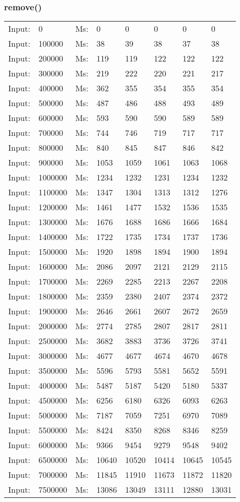 \documentclass[11pt,a4paper]{report}
\begin{document}
\begin{tiny}
\subsubsection*{remove()}
\begin{tabular}{l l ||l  l  l  l  l  l}
Input:&0&Ms:&0&0&0&0&0\\
Input:&100000&Ms:&38&39&38&37&38\\
Input:&200000&Ms:&119&119&122&122&122\\
Input:&300000&Ms:&219&222&220&221&217\\
Input:&400000&Ms:&362&355&354&355&354\\
Input:&500000&Ms:&487&486&488&493&489\\
Input:&600000&Ms:&593&590&590&589&589\\
Input:&700000&Ms:&744&746&719&717&717\\
Input:&800000&Ms:&840&845&847&846&842\\
Input:&900000&Ms:&1053&1059&1061&1063&1068\\
Input:&1000000&Ms:&1234&1232&1231&1234&1232\\
Input:&1100000&Ms:&1347&1304&1313&1312&1276\\
Input:&1200000&Ms:&1461&1477&1532&1536&1535\\
Input:&1300000&Ms:&1676&1688&1686&1666&1684\\
Input:&1400000&Ms:&1722&1735&1734&1737&1736\\
Input:&1500000&Ms:&1920&1898&1894&1900&1894\\
Input:&1600000&Ms:&2086&2097&2121&2129&2115\\
Input:&1700000&Ms:&2269&2285&2213&2267&2208\\
Input:&1800000&Ms:&2359&2380&2407&2374&2372\\
Input:&1900000&Ms:&2646&2661&2607&2672&2659\\
Input:&2000000&Ms:&2774&2785&2807&2817&2811\\
Input:&2500000&Ms:&3682&3883&3736&3726&3741\\
Input:&3000000&Ms:&4677&4677&4674&4670&4678\\
Input:&3500000&Ms:&5596&5793&5581&5652&5591\\
Input:&4000000&Ms:&5487&5187&5420&5180&5337\\
Input:&4500000&Ms:&6256&6180&6326&6093&6263\\
Input:&5000000&Ms:&7187&7059&7251&6970&7089\\
Input:&5500000&Ms:&8424&8350&8268&8346&8259\\
Input:&6000000&Ms:&9366&9454&9279&9548&9402\\
Input:&6500000&Ms:&10640&10520&10414&10645&10545\\
Input:&7000000&Ms:&11845&11910&11673&11872&11820\\
Input:&7500000&Ms:&13086&13049&13111&12880&13031\\
\end{tabular}


\end{tiny}
\end{document}
